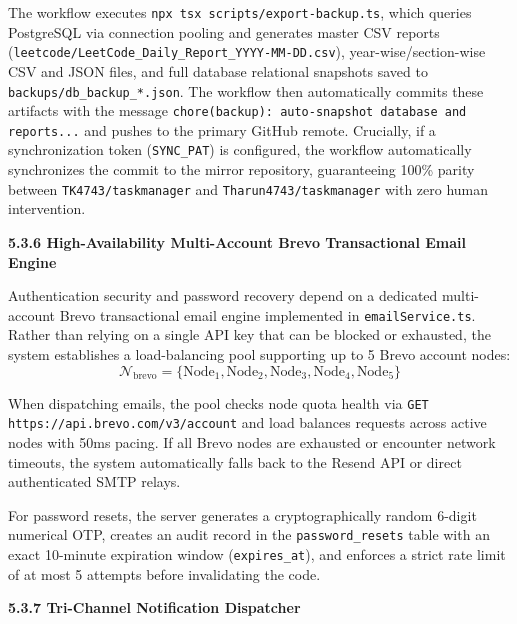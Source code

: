 {The workflow executes \texttt{npx tsx scripts/export-backup.ts}, which queries PostgreSQL via connection pooling and generates master CSV reports (\texttt{leetcode/LeetCode\_Daily\_Report\_YYYY-MM-DD.csv}), year-wise/section-wise CSV and JSON files, and full database relational snapshots saved to \texttt{backups/db\_backup\_*.json}. The workflow then automatically commits these artifacts with the message \texttt{chore(backup): auto-snapshot database and reports...} and pushes to the primary GitHub remote. Crucially, if a synchronization token (\texttt{SYNC\_PAT}) is configured, the workflow automatically synchronizes the commit to the mirror repository, guaranteeing 100\% parity between \texttt{TK4743/taskmanager} and \texttt{Tharun4743/taskmanager} with zero human intervention.

\vspace{0.4cm}
{\fontsize{13pt}{17pt}\selectfont\bfseries 5.3.6 High-Availability Multi-Account Brevo Transactional Email Engine\par}
\vspace{0.2cm}

Authentication security and password recovery depend on a dedicated multi-account Brevo transactional email engine implemented in \texttt{emailService.ts}. Rather than relying on a single API key that can be blocked or exhausted, the system establishes a load-balancing pool supporting up to 5 Brevo account nodes:
\begin{equation}
\mathcal{N}_{\text{brevo}} = \{\text{Node}_1, \text{Node}_2, \text{Node}_3, \text{Node}_4, \text{Node}_5\}
\end{equation}

When dispatching emails, the pool checks node quota health via \texttt{GET https://api.brevo.com/v3/account} and load balances requests across active nodes with 50ms pacing. If all Brevo nodes are exhausted or encounter network timeouts, the system automatically falls back to the Resend API or direct authenticated SMTP relays.

For password resets, the server generates a cryptographically random 6-digit numerical OTP, creates an audit record in the \texttt{password\_resets} table with an exact 10-minute expiration window (\texttt{expires\_at}), and enforces a strict rate limit of at most 5 attempts before invalidating the code.

\vspace{0.4cm}
{\fontsize{13pt}{17pt}\selectfont\bfseries 5.3.7 Tri-Channel Notification Dispatcher\par}
\vspace{0.2cm}

}
